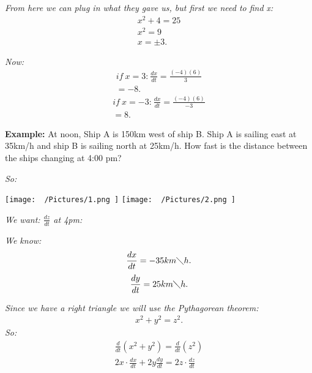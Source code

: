 \documentclass{report}
\begin{document}
    \bigbreak \noindent 
    \textit{From here we can plug in what they gave us, but first we need to find x:}
    \begin{align*}
        x^{2} + 4 = 25 \\
        x^{2} = 9 \\
        x = \pm 3
    .\end{align*}

    \bigbreak \noindent 
    \textit{
      Now:
    }
    \begin{align*}
      if\ x = 3\text{:}\ \frac{dx}{dt} = \frac{(-4)(6)}{3} \\
    = -8
    .\end{align*}
    \begin{align*}
      if\ x = -3\text{:}\ \frac{dx}{dt} = \frac{(-4)(6)}{-3} \\
      = 8
    .\end{align*}

    \bigbreak \noindent 
    \begin{mdframed}
      \textbf{Example:}
      At noon, Ship A is 150km west of ship B. Ship A is sailing east at 35km/h
      and ship B is sailing north at 25km/h. How fast is the distance between the ships
      changing at 4:00 pm? 
    \end{mdframed}
    \bigbreak \noindent
    \textit{So:}
    \begin{center}
      \texttt{[image:  ~/Pictures/1.png ]}
      \texttt{[image:  ~/Pictures/2.png ]}
    \end{center}

    \bigbreak \noindent 
    \textit{We want: $\frac{dz}{dt}$ at 4pm:}

    \bigbreak \noindent 
    \textit{We know:}
    \begin{align*}
      \frac{dx}{dt} = -35 km \diagdown h
    .\end{align*}
    \begin{align*}
      \frac{dy}{dt} = 25 km \diagdown h
    .\end{align*}
    \bigbreak \noindent 

    \bigbreak \noindent 
    \textit{Since we have a right triangle we will use the Pythagorean theorem:}
    \begin{align*}
      x^{2} + y^{2} = z^{2}
    .\end{align*}
    \bigbreak \noindent
    \textit{So:}
    \begin{align*}
      \frac{d}{dt}(x^{2}+y^{2}) = \frac{d}{dt}(z^{2}) \\ 
      2x \cdot \frac{dx}{dt}  +2y \frac{dy}{dt} = 2z \cdot \frac{dz}{dt}
    \end{align*}
\end{document}
